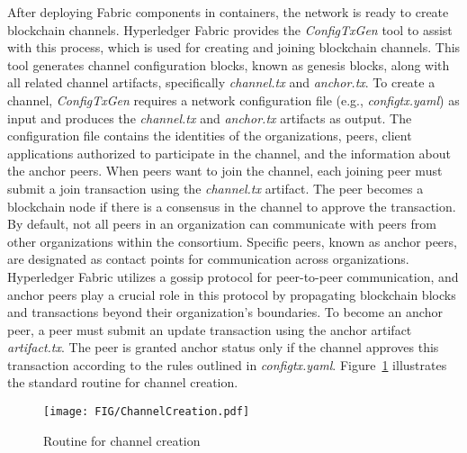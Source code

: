\documentclass[conference]{IEEEtran}
\begin{document}
After deploying Fabric components in containers, the network is ready to create blockchain channels. Hyperledger Fabric provides the \textit{ConfigTxGen} tool to assist with this process, which is used for creating and joining blockchain channels. This tool generates channel configuration blocks, known as genesis blocks, along with all related channel artifacts, specifically \textit{channel.tx} and \textit{anchor.tx}. To create a channel, \textit{ConfigTxGen} requires a network configuration file (e.g.,  \textit{configtx.yaml}) as input and produces the \textit{channel.tx} and \textit{anchor.tx} artifacts as output. The configuration file contains the identities of the organizations, peers, client applications authorized to participate in the channel, and the information about the anchor peers. When peers want to join the channel, each joining peer must submit a join transaction using the \textit{channel.tx} artifact. The peer becomes a blockchain node if there is a consensus in the channel to approve the transaction. By default, not all peers in an organization can communicate with peers from other organizations within the consortium. Specific peers, known as anchor peers, are designated as contact points for communication across organizations. Hyperledger Fabric utilizes a gossip protocol for peer-to-peer communication, and anchor peers play a crucial role in this protocol by propagating blockchain blocks and transactions beyond their organization's boundaries. To become an anchor peer, a peer must submit an update transaction using the anchor artifact \textit{artifact.tx}. The peer is granted anchor status only if the channel approves this transaction according to the rules outlined in  \textit{configtx.yaml}. Figure~\ref{fig:channelCreationRoutine} illustrates the standard routine for channel creation. \\ 
%
\begin{figure}
    \centering
    \texttt{[image: FIG/ChannelCreation.pdf]}
    \caption{Routine for channel creation}
    \label{fig:channelCreationRoutine}
\end{figure}
%
\end{document}
